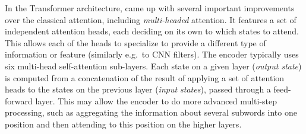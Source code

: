 \documentclass[11pt,a4paper]{article}
\newcommand\eg{e.g.\ }
\newcommand{\word}{\emph{input state}\xspace}
\newcommand{\words}{\emph{input states}\xspace}
\newcommand{\state}{\emph{output state}\xspace}
\newcommand{\states}{\emph{output states}\xspace}
\def\RR#1{{\color{blue}RR: \it #1}}
\def\JL#1{{\color{magenta}JL: \it #1}}
\def\JL#1{}
\def\RR#1{}
\begin{document}
In the Transformer architecture, \citet{vaswani2017attention} came up with several important improvements over the classical attention,
including \emph{multi-headed} attention. It features
a set of independent attention heads, each deciding on its own to which states to attend.
This allows each of the heads to specialize to provide a different type of information or feature (similarly \eg to CNN filters).
The encoder typically uses six multi-head self-attention sub-layers.
Each state
on a given layer (\state) is computed from a concatenation of the result of applying a set of attention heads to the states on the previous layer (\words),
passed through a feed-forward layer.
This may allow the encoder to do more advanced multi-step processing, such as aggregating the information about several subwords into one position and then attending to this position on the higher layers.

\end{document}
